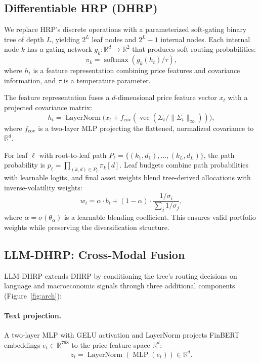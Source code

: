 \documentclass[11pt]{article}
\begin{document}
\subsection{Differentiable HRP (DHRP)}

We replace HRP's discrete operations with a parameterized soft-gating binary tree of depth $L$, yielding $2^L$ leaf nodes and $2^L - 1$ internal nodes. Each internal node $k$ has a gating network $g_k: \mathbb{R}^d \to \mathbb{R}^2$ that produces soft routing probabilities:
\begin{equation}
    \pi_k = \operatorname{softmax}(g_k(h_t) / \tau),
\end{equation}
where $h_t$ is a feature representation combining price features and covariance information, and $\tau$ is a temperature parameter.

The feature representation fuses a $d$-dimensional price feature vector $x_t$ with a projected covariance matrix:
\begin{equation}
    h_t = \operatorname{LayerNorm}\big(x_t + f_{\text{cov}}(\operatorname{vec}(\Sigma_t / \|\Sigma_t\|_\infty))\big),
\end{equation}
where $f_{\text{cov}}$ is a two-layer MLP projecting the flattened, normalized covariance to $\mathbb{R}^d$.

For leaf $\ell$ with root-to-leaf path $P_\ell = \{(k_1, d_1), \ldots, (k_L, d_L)\}$, the path probability is $p_\ell = \prod_{(k, d) \in P_\ell} \pi_k[d]$. Leaf budgets combine path probabilities with learnable logits, and final asset weights blend tree-derived allocations with inverse-volatility weights:
\begin{equation}
    w_i = \alpha \cdot b_i + (1 - \alpha) \cdot \frac{1/\sigma_i}{\sum_j 1/\sigma_j},
\end{equation}
where $\alpha = \sigma(\theta_\alpha)$ is a learnable blending coefficient. This ensures valid portfolio weights while preserving the diversification structure.

\subsection{LLM-DHRP: Cross-Modal Fusion}

LLM-DHRP extends DHRP by conditioning the tree's routing decisions on language and macroeconomic signals through three additional components (Figure~\ref{fig:arch}):

\paragraph{Text projection.} A two-layer MLP with GELU activation and LayerNorm projects FinBERT embeddings $e_t \in \mathbb{R}^{768}$ to the price feature space $\mathbb{R}^d$:
\begin{equation}
    z_t = \operatorname{LayerNorm}(\operatorname{MLP}(e_t)) \in \mathbb{R}^d.
\end{equation}
\end{document}
